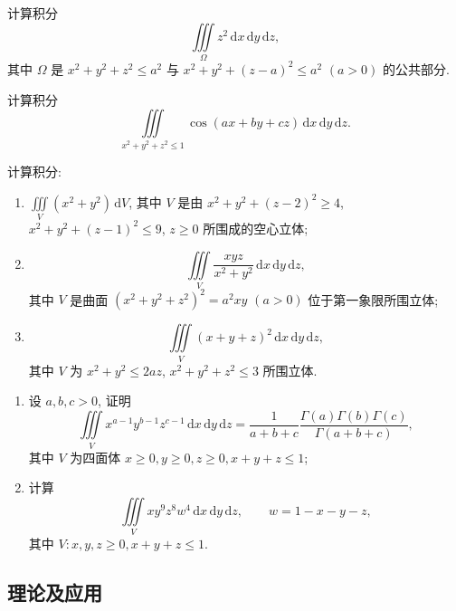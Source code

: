 \documentclass[../数学分析培优讲义.tex]{subfiles}
\begin{document}
\begin{example}
计算积分
\[
    \iiint\limits_\Omega z^2\,\mathrm{d}x\,\mathrm{d}y\,\mathrm{d}z,
\]
其中 $\Omega$ 是 $x^2+y^2+z^2\leq a^2$ 与 $x^2+y^2+(z-a)^2\leq a^2$ $(a>0)$ 的公共部分.
\end{example}
\exampleblank

\begin{example}
计算积分
\[
    \iiint\limits_{x^2+y^2+z^2\leq1}\cos(ax+by+cz)\,\mathrm{d}x\,\mathrm{d}y\,\mathrm{d}z.
\]
\end{example}
\exampleblank

\begin{example}
计算积分:
\begin{enumerate}[label=(\arabic*)]
    \item $\displaystyle\iiint\limits_V(x^2+y^2)\,\mathrm{d}V$, 其中 $V$ 是由 $x^2+y^2+(z-2)^2\geq4$, $x^2+y^2+(z-1)^2\leq9$, $z\geq0$ 所围成的空心立体;
    \item
    \[
        \iiint\limits_V\dfrac{xyz}{x^2+y^2}\,\mathrm{d}x\,\mathrm{d}y\,\mathrm{d}z,
    \]
    其中 $V$ 是曲面 $(x^2+y^2+z^2)^2=a^2xy$ $(a>0)$ 位于第一象限所围立体;
    \item
    \[
        \iiint\limits_V(x+y+z)^2\,\mathrm{d}x\,\mathrm{d}y\,\mathrm{d}z,
    \]
    其中 $V$ 为 $x^2+y^2\leq2az$, $x^2+y^2+z^2\leq3$ 所围立体.
\end{enumerate}
\end{example}
\exampleblank

\begin{example}[\markstar]
\begin{enumerate}[label=(\arabic*)]
    \item 设 $a,b,c>0$, 证明
    \[
        \iiint\limits_Vx^{a-1}y^{b-1}z^{c-1}\,\mathrm{d}x\,\mathrm{d}y\,\mathrm{d}z
        =\dfrac{1}{a+b+c}\dfrac{\Gamma(a)\Gamma(b)\Gamma(c)}{\Gamma(a+b+c)},
    \]
    其中 $V$ 为四面体 $x\geq0,y\geq0,z\geq0,x+y+z\leq1$;
    \item 计算
    \[
        \iiint\limits_Vxy^9z^8w^4\,\mathrm{d}x\,\mathrm{d}y\,\mathrm{d}z,
        \qquad w=1-x-y-z,
    \]
    其中 $V:x,y,z\geq0,x+y+z\leq1$.
\end{enumerate}
\end{example}
\exampleblank


\newpage

\subsection{理论及应用}
\end{document}
